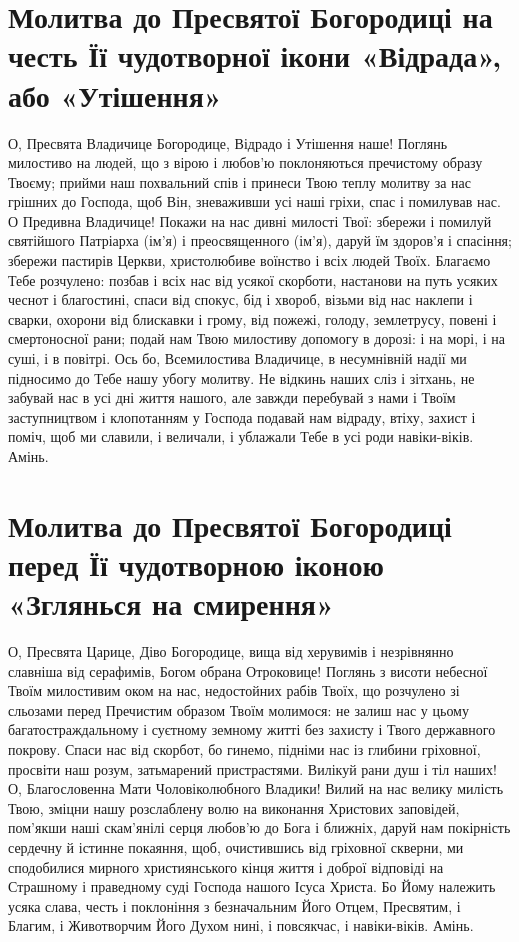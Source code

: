 \documentclass[chapters.tex]{subfiles}
\begin{document}
\section{Молитва до Пресвятої Богородиці на честь Її чудотворної ікони «Відрада», або «Утішення»}
О, Пресвята Владичице Богородице, Відрадо і Утішення наше! Поглянь милостиво на людей, що з вірою і любов’ю поклоняються пречистому образу Твоєму; прийми наш похвальний спів і принеси Твою теплу молитву за нас грішних до Господа, щоб Він, зневаживши усі наші гріхи, спас і помилував нас. О Предивна Владичице! Покажи на нас дивні милості Твої: збережи і помилуй святійшого Патріарха (ім’я) і преосвященного (ім’я), даруй їм здоров’я і спасіння; збережи пастирів Церкви, христолюбиве воїнство і всіх людей Твоїх. Благаємо Тебе розчулено: позбав і всіх нас від усякої скорботи, настанови на путь усяких чеснот і благостині, спаси від спокус, бід і хвороб, візьми від нас наклепи і сварки, охорони від блискавки і грому, від пожежі, голоду, землетрусу, повені і смертоносної рани; подай нам Твою милостиву допомогу в дорозі: і на морі, і на суші, і в повітрі. Ось бо, Всемилостива Владичице, в несумнівній надії ми підносимо до Тебе нашу убогу молитву. Не відкинь наших сліз і зітхань, не забувай нас в усі дні життя нашого, але завжди перебувай з нами і Твоїм заступництвом і клопотанням у Господа подавай нам відраду, втіху, захист і поміч, щоб ми славили, і величали, і ублажали Тебе в усі роди навіки-віків. Амінь.

\section{Молитва до Пресвятої Богородиці перед Її чудотворною іконою «Зглянься на смирення»}
О, Пресвята Царице, Діво Богородице, вища від херувимів і незрівнянно славніша від серафимів, Богом обрана Отроковице! Поглянь з висоти небесної Твоїм милостивим оком на нас, недостойних рабів Твоїх, що розчулено зі сльозами перед Пречистим образом Твоїм молимося: не залиш нас у цьому багатостраждальному і суєтному земному житті без захисту і Твого державного покрову. Спаси нас від скорбот, бо гинемо, підніми нас із глибини гріховної, просвіти наш розум, затьмарений пристрастями. Вилікуй рани душ і тіл наших! О, Благословенна Мати Чоловіколюбного Владики! Вилий на нас велику милість Твою, зміцни нашу розслаблену волю на виконання Христових заповідей, пом’якши наші скам’янілі серця любов’ю до Бога і ближніх, даруй нам покірність сердечну й істинне покаяння, щоб, очистившись від гріховної скверни, ми сподобилися мирного християнського кінця життя і доброї відповіді на Страшному і праведному суді Господа нашого Ісуса Христа. Бо Йому належить усяка слава, честь і поклоніння з безначальним Його Отцем, Пресвятим, і Благим, і Животворчим Його Духом нині, і повсякчас, і навіки-віків. Амінь.
\end{document}
